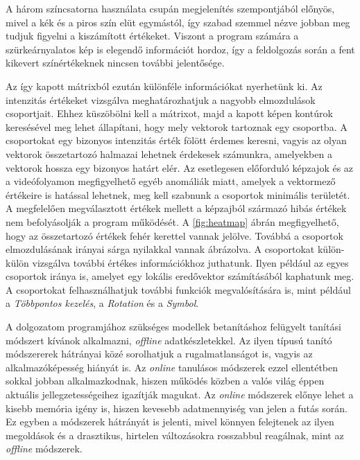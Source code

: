 A három színcsatorna használata csupán megjelenítés szempontjából előnyös, mivel a kék és a piros szín elüt egymástól, így szabad szemmel nézve jobban meg tudjuk figyelni a kiszámított értékeket. Viszont a program számára a szürkeárnyalatos kép is elegendő információt hordoz, így a feldolgozás során a fent kikevert színértékeknek nincsen további jelentősége.

Az így kapott mátrixból ezután különféle információkat nyerhetünk ki. Az intenzitás értékeket vizsgálva meghatározhatjuk a nagyobb elmozdulások csoportjait. Ehhez küszöbölni kell a mátrixot, majd a kapott képen kontúrok keresésével meg lehet állapítani, hogy mely vektorok tartoznak egy csoportba. A csoportokat egy bizonyos intenzitás érték fölött érdemes keresni, vagyis az olyan vektorok összetartozó halmazai lehetnek érdekesek számunkra, amelyekben a vektorok hossza egy bizonyos határt elér. Az esetlegesen előforduló képzajok és az a videófolyamon megfigyelhető egyéb anomáliák miatt, amelyek a vektormező értékeire is hatással lehetnek, meg kell szabnunk a csoportok minimális területét. A megfelelően megválasztott értékek mellett a képzajból származó hibás értékek nem befolyásolják a program működését.
A \ref{fig:heatmap} ábrán megfigyelhető, hogy az összetartozó értékek fehér kerettel vannak jelölve. Továbbá a csoportok elmozdulásának irányai sárga nyilakkal vannak ábrázolva. A csoportokat külön-külön vizsgálva további értékes információkhoz juthatunk. Ilyen például az egyes csoportok iránya is, amelyet egy lokális eredővektor számításából kaphatunk meg. A csoportokat felhasználhatjuk további funkciók megvalósítására is, mint például a \textit{Többpontos kezelés}, a \textit{Rotation} és a \textit{Symbol}.


A dolgozatom programjához szükséges modellek betanításhoz felügyelt tanítási módszert kívánok alkalmazni, \textit{offline} adatkészletekkel. Az ilyen típusú tanító módszererek hátrányai közé sorolhatjuk a rugalmatlanságot is, vagyis az alkalmazóképesség hiányát is. Az \textit{online} tanulásos módszerek ezzel ellentétben sokkal jobban alkalmazkodnak, hiszen működés közben a valós világ éppen aktuális jellegzetességeihez igazítják magukat. Az \textit{online} módszerek előnye lehet a kisebb memória igény is, hiszen kevesebb adatmennyiség van jelen a futás során. Ez egyben a módszerek hátrányát is jelenti, mivel könnyen felejtenek az ilyen megoldások és a drasztikus, hirtelen változásokra rosszabbul reagálnak, mint az \textit{offline} módszerek. \cite{geron2019hands}


